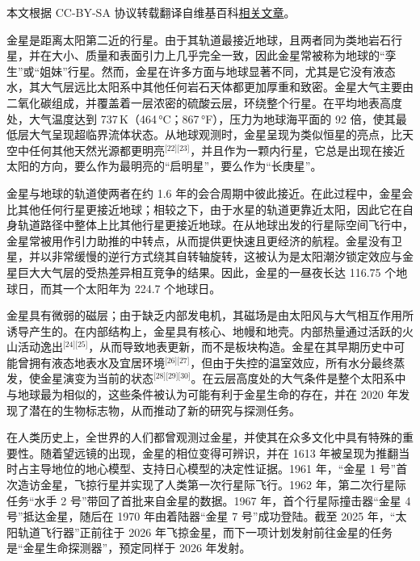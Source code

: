 
本文根据 CC-BY-SA 协议转载翻译自维基百科\href{https://en.wikipedia.org/wiki/Venus}{相关文章}。

金星是距离太阳第二近的行星。由于其轨道最接近地球，且两者同为类地岩石行星，并在大小、质量和表面引力上几乎完全一致，因此金星常被称为地球的“孪生”或“姐妹”行星。然而，金星在许多方面与地球显著不同，尤其是它没有液态水，其大气层远比太阳系中其他任何岩石天体都更加厚重和致密。金星大气主要由二氧化碳组成，并覆盖着一层浓密的硫酸云层，环绕整个行星。在平均地表高度处，大气温度达到 737\,K（464\,°C；867\,°F），压力为地球海平面的 92 倍，使其最低层大气呈现超临界流体状态。从地球观测时，金星呈现为类似恒星的亮点，比天空中任何其他天然光源都更明亮\(^\text{[22][23]}\)，并且作为一颗内行星，它总是出现在接近太阳的方向，要么作为最明亮的“启明星”，要么作为“长庚星”。

金星与地球的轨道使两者在约 1.6 年的会合周期中彼此接近。在此过程中，金星会比其他任何行星更接近地球；相较之下，由于水星的轨道更靠近太阳，因此它在自身轨道路径中整体上比其他行星更接近地球。在从地球出发的行星际空间飞行中，金星常被用作引力助推的中转点，从而提供更快速且更经济的航程。金星没有卫星，并以非常缓慢的逆行方式绕其自转轴旋转，这被认为是太阳潮汐锁定效应与金星巨大大气层的受热差异相互竞争的结果。因此，金星的一昼夜长达 116.75 个地球日，而其一个太阳年为 224.7 个地球日。

金星具有微弱的磁层；由于缺乏内部发电机，其磁场是由太阳风与大气相互作用所诱导产生的。在内部结构上，金星具有核心、地幔和地壳。内部热量通过活跃的火山活动逸出\(^\text{[24][25]}\)，从而导致地表更新，而不是板块构造。金星在其早期历史中可能曾拥有液态地表水及宜居环境\(^\text{[26][27]}\)，但由于失控的温室效应，所有水分最终蒸发，使金星演变为当前的状态\(^\text{[28][29][30]}\)。在云层高度处的大气条件是整个太阳系中与地球最为相似的，这些条件被认为可能有利于金星生命的存在，并在 2020 年发现了潜在的生物标志物，从而推动了新的研究与探测任务。

在人类历史上，全世界的人们都曾观测过金星，并使其在众多文化中具有特殊的重要性。随着望远镜的出现，金星的相位变得可辨识，并在 1613 年被呈现为推翻当时占主导地位的地心模型、支持日心模型的决定性证据。1961 年，“金星 1 号”首次造访金星，飞掠行星并实现了人类第一次行星际飞行。1962 年，第二次行星际任务“水手 2 号”带回了首批来自金星的数据。1967 年，首个行星际撞击器“金星 4 号”抵达金星，随后在 1970 年由着陆器“金星 7 号”成功登陆。截至 2025 年，“太阳轨道飞行器”正前往于 2026 年飞掠金星，而下一项计划发射前往金星的任务是“金星生命探测器”，预定同样于 2026 年发射。
